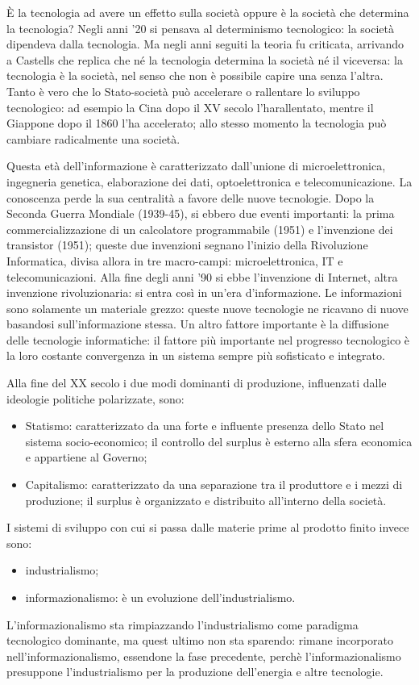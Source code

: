 \documentclass[a4page, 11pt]{article}
\begin{document}
È la tecnologia ad avere un effetto sulla società oppure è la società che determina la tecnologia?
Negli anni '20 si pensava al determinismo tecnologico: la società dipendeva dalla tecnologia.
Ma negli anni seguiti la teoria fu criticata, arrivando a Castells che replica che né la tecnologia determina la società né il viceversa: la tecnologia è la società, nel senso che non è possibile capire una senza l'altra.
Tanto è vero che lo Stato-società può accelerare o rallentare lo sviluppo tecnologico: ad esempio la Cina dopo il XV secolo l'harallentato, mentre il Giappone dopo il 1860 l'ha accelerato; allo stesso momento la tecnologia può cambiare radicalmente una società.

Questa età dell'informazione è caratterizzato dall'unione di microelettronica, ingegneria genetica, elaborazione dei dati, optoelettronica e telecomunicazione.
La conoscenza perde la sua centralità a favore delle nuove tecnologie.
Dopo la Seconda Guerra Mondiale (1939-45), si ebbero due eventi importanti: la prima commercializzazione di un calcolatore programmabile (1951) e l'invenzione dei transistor (1951); queste due invenzioni segnano l'inizio della Rivoluzione Informatica, divisa allora in tre macro-campi: microelettronica, IT e telecomunicazioni.
Alla fine degli anni '90 si ebbe l'invenzione di Internet, altra invenzione rivoluzionaria: si entra così in un'era d'informazione.
Le informazioni sono solamente un materiale grezzo: queste nuove tecnologie ne ricavano di nuove basandosi sull'informazione stessa.
Un altro fattore importante è la diffusione delle tecnologie informatiche: il fattore più importante nel progresso tecnologico è la loro costante convergenza in un sistema sempre più sofisticato e integrato.

Alla fine del XX secolo i due modi dominanti di produzione, influenzati dalle ideologie politiche polarizzate, sono:
\begin{itemize}
  \item Statismo: caratterizzato da una forte e influente presenza dello Stato nel sistema socio-economico; il controllo del surplus è esterno alla sfera economica e appartiene al Governo;
  \item Capitalismo: caratterizzato da una separazione tra il produttore e i mezzi di produzione; il surplus è organizzato e distribuito all'interno della società.
\end{itemize}
I sistemi di sviluppo con cui si passa dalle materie prime al prodotto finito invece sono:
\begin{itemize}
  \item industrialismo;
  \item informazionalismo: è un evoluzione dell'industrialismo.
\end{itemize}
L'informazionalismo sta rimpiazzando l'industrialismo come paradigma tecnologico dominante, ma quest ultimo non sta sparendo: rimane incorporato nell'informazionalismo, essendone la fase precedente, perchè l'informazionalismo presuppone l'industrialismo per la produzione dell'energia e altre tecnologie.
\end{document}
